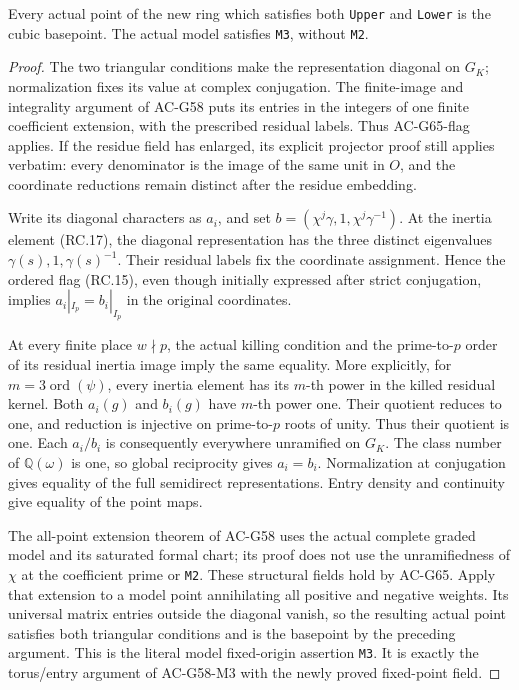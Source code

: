 \begin{theorem}
\label{AC-G66-fixed}
Every actual point of the new ring which satisfies both
\texttt{Upper} and \texttt{Lower} is the cubic basepoint.
The actual model satisfies \texttt{M3}, without \texttt{M2}.
\end{theorem}
\begin{proof}
The two triangular conditions make the representation
diagonal on \(G_K\); normalization fixes its value at
complex conjugation. The finite-image and integrality
argument of AC-G58 puts its entries in the integers of
one finite coefficient extension, with the prescribed
residual labels. Thus AC-G65-flag applies. If the residue
field has enlarged, its explicit projector proof still
applies verbatim: every denominator is the image of the
same unit in \(O\), and the coordinate reductions remain
distinct after the residue embedding.

Write its diagonal characters as \(a_i\), and set
\(b=(\chi^j\gamma,1,\chi^j\gamma^{-1})\).
At the inertia element (RC.17), the diagonal representation
has the three distinct eigenvalues \(\gamma(s),1,
\gamma(s)^{-1}\). Their residual labels fix the coordinate
assignment. Hence the ordered flag (RC.15), even though
initially expressed after strict conjugation, implies
\(a_i|_{I_p}=b_i|_{I_p}\) in the original coordinates.

At every finite place \(w\nmid p\), the actual killing
condition and the prime-to-\(p\) order of its residual
inertia image imply the same equality. More explicitly,
for \(m=3\operatorname{ord}(\psi)\), every inertia element
has its \(m\)-th power in the killed residual kernel.
Both \(a_i(g)\) and \(b_i(g)\) have \(m\)-th power one.
Their quotient reduces to one, and reduction is injective
on prime-to-\(p\) roots of unity. Thus their quotient is
one. Each \(a_i/b_i\) is consequently everywhere
unramified on \(G_K\). The class number of
\(\mathbb Q(\omega)\) is one, so global reciprocity gives
\(a_i=b_i\). Normalization at conjugation gives equality
of the full semidirect representations. Entry density and
continuity give equality of the point maps.

The all-point extension theorem of AC-G58 uses the actual
complete graded model and its saturated formal chart; its
proof does not use the unramifiedness of \(\chi\) at the
coefficient prime or \texttt{M2}. These structural fields
hold by AC-G65. Apply that extension to a model point
annihilating all positive and negative weights. Its
universal matrix entries outside the diagonal vanish, so
the resulting actual point satisfies both triangular
conditions and is the basepoint by the preceding argument.
This is the literal model fixed-origin assertion
\texttt{M3}. It is exactly the torus/entry argument of
AC-G58-M3 with the newly proved fixed-point field.
\end{proof}

